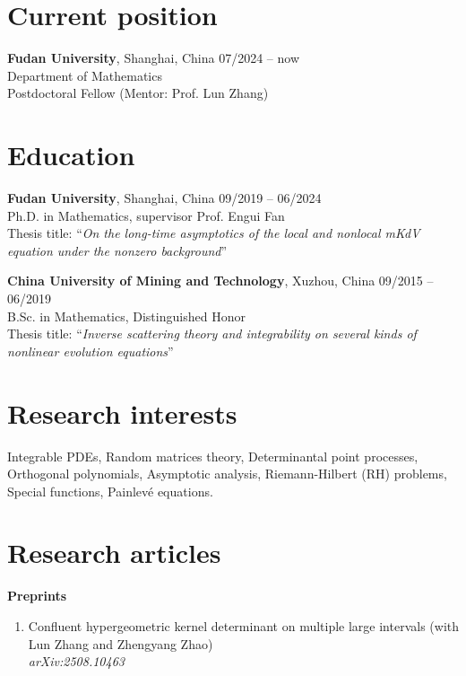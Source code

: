 \documentclass[margin]{res}
\begin{document}
\begin{resume}
\section{Current position}
\textbf{Fudan University}, Shanghai, China \hfill 07/2024 -- now\\
Department of Mathematics \\
Postdoctoral Fellow (Mentor: Prof. Lun Zhang)


\section{Education}
\textbf{Fudan University}, Shanghai, China \hfill 09/2019 -- 06/2024\\
Ph.D. in Mathematics, supervisor Prof. Engui Fan \\
Thesis title: ``{\sl On the long-time asymptotics of the local and nonlocal mKdV equation under the nonzero background}''
\par

\textbf{China University of Mining and Technology}, Xuzhou, China \hfill 09/2015 -- 06/2019\\ 
B.Sc. in Mathematics, Distinguished Honor \\
Thesis title: ``{\sl Inverse scattering theory and integrability on several kinds of nonlinear evolution equations}''


\section{Research interests}
Integrable PDEs, Random matrices theory, Determinantal point processes, 
Orthogonal polynomials, Asymptotic analysis, Riemann-Hilbert (RH) problems, Special functions, 
Painlev\'e equations.

\section{Research articles}
\textbf{Preprints}
\begin{enumerate}[1.]
    \item Confluent hypergeometric kernel determinant on multiple large intervals (with Lun Zhang and Zhengyang Zhao)\\
    {\sl arXiv:2508.10463}


\end{enumerate}
\end{resume}
\end{document}
